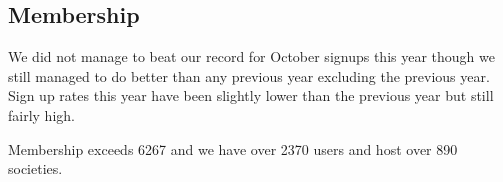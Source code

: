 \subsection{Membership}
We did not manage to beat our record for October signups this year though we still managed to do better than any previous year excluding the previous year. Sign up rates this year have been slightly lower than the previous year but still fairly high.

Membership exceeds 6267 and we have over 2370 users and host over 890 societies.